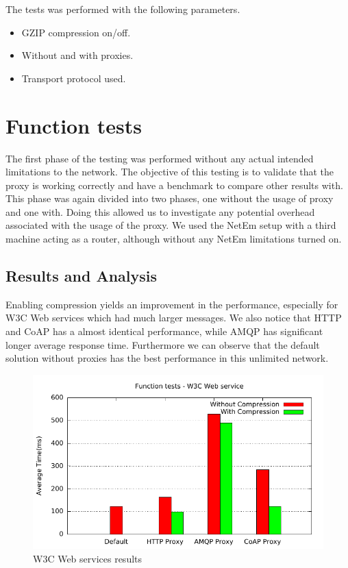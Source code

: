 The tests was performed with the following parameters.

\begin{itemize}
	\item GZIP compression on/off.
	\item Without and with proxies.
    \item Transport protocol used.
\end{itemize}


\section{Function tests}

The first phase of the testing was performed without any actual intended
limitations to the network. The objective of this testing is to validate that
the proxy is working correctly and have a benchmark to compare other results
with. This phase was again divided into two phases, one without the usage of
proxy and one with. Doing this allowed us to investigate any potential
overhead associated with the usage of the proxy. We used the NetEm setup with
a third machine acting as a router, although without any NetEm limitations
turned on.


\subsection{Results and Analysis}

Enabling compression yields an improvement in the performance, especially for
W3C Web services which had much larger messages. We also notice that HTTP and
CoAP has a almost identical performance, while AMQP has significant longer
average response time. Furthermore we can observe that the default solution
without proxies has the best performance in this unlimited network.

\begin{figure}[H]
\center
\includegraphics[scale=0.75]{../results/function_tests/nffi/out.pdf}
\caption{W3C Web services results}
\end{figure}

